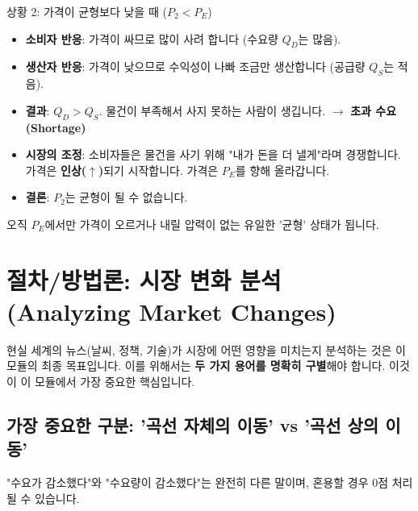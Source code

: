 \documentclass[11pt,a4paper]{book}
\theoremstyle{definition}
\begin{document}
\begin{mybox}{상황 2: 가격이 균형보다 낮을 때 ($P_2 < P_E$)}
    \begin{itemize}
        \item \textbf{소비자 반응}: 가격이 싸므로 많이 사려 합니다 (수요량 $Q_D$는 많음).
        \item \textbf{생산자 반응}: 가격이 낮으므로 수익성이 나빠 조금만 생산합니다 (공급량 $Q_S$는 적음).
        \item \textbf{결과}: $Q_D > Q_S$. 물건이 부족해서 사지 못하는 사람이 생깁니다. $\rightarrow$ \textbf{초과 수요 (Shortage)}
        \item \textbf{시장의 조정}: 소비자들은 물건을 사기 위해 "내가 돈을 더 낼게"라며 경쟁합니다. 가격은 \textbf{인상($\uparrow$)}되기 시작합니다. 가격은 $P_E$를 향해 올라갑니다.
        \item \textbf{결론}: $P_2$는 균형이 될 수 없습니다.
    \end{itemize}
\end{mybox}

오직 $P_E$에서만 가격이 오르거나 내릴 압력이 없는 유일한 '균형' 상태가 됩니다.


\section{절차/방법론: 시장 변화 분석 (Analyzing Market Changes)}

현실 세계의 뉴스(날씨, 정책, 기술)가 시장에 어떤 영향을 미치는지 분석하는 것은 이 모듈의 최종 목표입니다.
이를 위해서는 \textbf{두 가지 용어를 명확히 구별}해야 합니다. 이것이 이 모듈에서 가장 중요한 핵심입니다.

\subsection{가장 중요한 구분: '곡선 자체의 이동' vs '곡선 상의 이동'}

\begin{warningbox}[title={치명적인 용어 혼동 (Jargon Warning)}]
    "수요가 감소했다"와 "수요량이 감소했다"는 완전히 다른 말이며, 혼용할 경우 0점 처리될 수 있습니다.
\end{warningbox}
\end{document}
